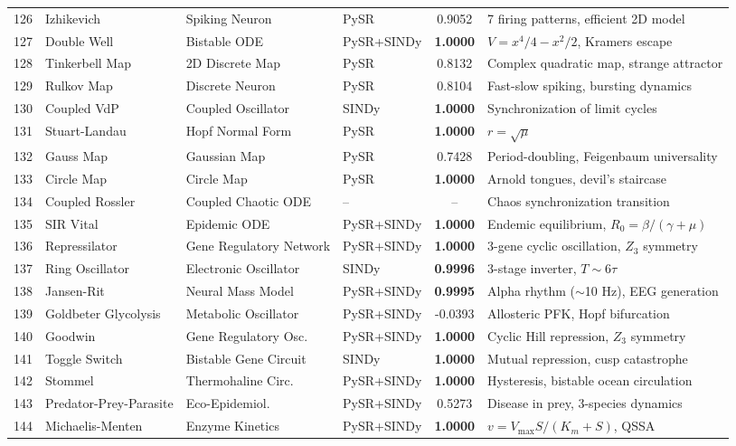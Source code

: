 \begin{table}[t]
\begin{tabular}{rlllcl}
126 & Izhikevich & Spiking Neuron & PySR & 0.9052 & 7 firing patterns, efficient 2D model \\
127 & Double Well & Bistable ODE & PySR+SINDy & \textbf{1.0000} & $V = x^4/4 - x^2/2$, Kramers escape \\
128 & Tinkerbell Map & 2D Discrete Map & PySR & 0.8132 & Complex quadratic map, strange attractor \\
129 & Rulkov Map & Discrete Neuron & PySR & 0.8104 & Fast-slow spiking, bursting dynamics \\
130 & Coupled VdP & Coupled Oscillator & SINDy & \textbf{1.0000} & Synchronization of limit cycles \\
131 & Stuart-Landau & Hopf Normal Form & PySR & \textbf{1.0000} & $r = \sqrt{\mu}$ \\
132 & Gauss Map & Gaussian Map & PySR & 0.7428 & Period-doubling, Feigenbaum universality \\
133 & Circle Map & Circle Map & PySR & \textbf{1.0000} & Arnold tongues, devil's staircase \\
134 & Coupled Rossler & Coupled Chaotic ODE & -- & -- & Chaos synchronization transition \\
135 & SIR Vital & Epidemic ODE & PySR+SINDy & \textbf{1.0000} & Endemic equilibrium, $R_0 = \beta/(\gamma+\mu)$ \\
136 & Repressilator & Gene Regulatory Network & PySR+SINDy & \textbf{1.0000} & 3-gene cyclic oscillation, $Z_3$ symmetry \\
137 & Ring Oscillator & Electronic Oscillator & SINDy & \textbf{0.9996} & 3-stage inverter, $T \sim 6\tau$ \\
138 & Jansen-Rit & Neural Mass Model & PySR+SINDy & \textbf{0.9995} & Alpha rhythm ($\sim$10 Hz), EEG generation \\
139 & Goldbeter Glycolysis & Metabolic Oscillator & PySR+SINDy & -0.0393 & Allosteric PFK, Hopf bifurcation \\
140 & Goodwin & Gene Regulatory Osc. & PySR+SINDy & \textbf{1.0000} & Cyclic Hill repression, $Z_3$ symmetry \\
141 & Toggle Switch & Bistable Gene Circuit & SINDy & \textbf{1.0000} & Mutual repression, cusp catastrophe \\
142 & Stommel & Thermohaline Circ. & PySR+SINDy & \textbf{1.0000} & Hysteresis, bistable ocean circulation \\
143 & Predator-Prey-Parasite & Eco-Epidemiol. & PySR+SINDy & 0.5273 & Disease in prey, 3-species dynamics \\
144 & Michaelis-Menten & Enzyme Kinetics & PySR+SINDy & \textbf{1.0000} & $v = V_{\max}S/(K_m{+}S)$, QSSA \\

\end{tabular}
\end{table}
